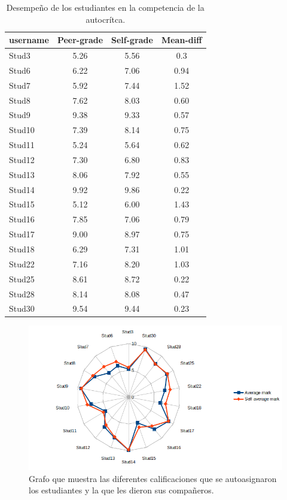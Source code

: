 \begin{table}
	\centering
	\caption{Desempeño de los estudiantes en la competencia de la autocrítca.}
	\label{tab:EvcWorkshop1}
	\begin{tabular}{|l|c|c|c|}
		\hline
		username & Peer-grade & Self-grade & Mean-diff \\
		\hline
		\hline
			Stud3 & 5.26 & 5.56 & 0.3 \\
			Stud6 & 6.22 & 7.06 & 0.94 \\
			Stud7 & 5.92 & 7.44 & 1.52 \\
			Stud8 & 7.62 & 8.03 & 0.60 \\
			Stud9 & 9.38 & 9.33 & 0.57 \\
			Stud10 & 7.39 & 8.14 & 0.75 \\
			Stud11 & 5.24 & 5.64 & 0.62 \\
			Stud12 & 7.30 & 6.80 & 0.83 \\
			Stud13 & 8.06 & 7.92 & 0.55 \\
			Stud14 & 9.92 & 9.86 & 0.22 \\
			Stud15 & 5.12 & 6.00 & 1.43 \\
			Stud16 & 7.85 & 7.06 & 0.79 \\
			Stud17 & 9.00 & 8.97 & 0.75 \\
			Stud18 & 6.29 & 7.31 & 1.01 \\
			Stud22 & 7.16 & 8.20 & 1.03 \\
			Stud25 & 8.61 & 8.72 & 0.22 \\
			Stud28 & 8.14 & 8.08 & 0.47 \\
			Stud30 & 9.54 & 9.44 & 0.23 \\
		\hline
	\end{tabular}
\end{table}

\begin{figure}
	\centering
	\includegraphics[width=12cm]{EvcWorkshop1.png}
	\caption{Grafo que muestra las diferentes calificaciones que se autoasignaron los estudiantes y la que les dieron sus compañeros.}
	\label{fig:EvcWorkshop1}
\end{figure}

